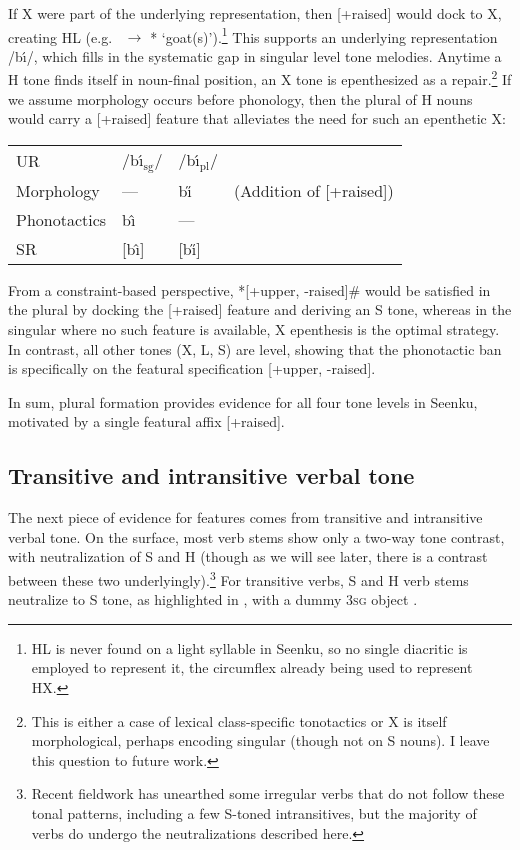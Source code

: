 \documentclass[output=paper]{langsci/langscibook}
\begin{document}
If X were part of the underlying representation, then [+raised] would dock to X, creating HL (e.g.\ {\it {}} $\rightarrow$ *{\it {}} `goat(s)').\footnote{HL is never found on a light syllable in Seenku, so no single diacritic is employed to represent it, the circumflex already being used to represent HX.} This supports an underlying representation /b\'{\i}/, which fills in the systematic gap in singular level tone melodies. Anytime a H tone finds itself in noun-final position, an X tone is epenthesized as a repair.\footnote{This is either a case of lexical class-specific tonotactics or X is itself morphological, perhaps encoding singular (though not on S nouns). I leave this question to future work.} If we assume morphology occurs before phonology, then the plural of H nouns would carry a [+raised] feature that alleviates the need for such an epenthetic X:

\ea\label{ex:mcpherson:10} \begin{tabular}[t]{llll}
UR & /b\'{\i}$_{\text{sg}}$/ & /b\'{\i}$_{\text{pl}}$/ & \\
Morphology & --- & b\H{\i} & (Addition of [+raised]) \\
Phonotactics & b\^{\i} & --- & \\
SR & [b\^{\i}] & [b\H{\i}] \\
\end{tabular}
\z 

From a constraint-based perspective, *[+upper, -raised]\# would be satisfied in the plural by docking the [+raised] feature and deriving an S tone, whereas in the singular where no such feature is available, X epenthesis is the optimal strategy. In contrast, all other tones (X, L, S) are level, showing that the phonotactic ban is specifically on the featural specification [+upper, -raised]. 

In sum, plural formation provides evidence for all four tone levels in Seenku, motivated by a single featural affix [+raised].

\subsection{Transitive and intransitive verbal tone}\label{sec:mcpherson:SecTransitive}

The next piece of evidence for features comes from transitive and intransitive verbal tone. On the surface, most verb stems show only a two-way tone contrast, with neutralization of S and H (though as we will see later, there is a contrast between these two underlyingly).\footnote{Recent fieldwork has unearthed some irregular verbs that do not follow these tonal patterns, including a few S-toned intransitives, but the majority of verbs do undergo the neutralizations described here.} For transitive verbs, S and H verb stems neutralize to S tone, as highlighted in , with a dummy 3\textsc{sg} object {\it {}}.
\end{document}
